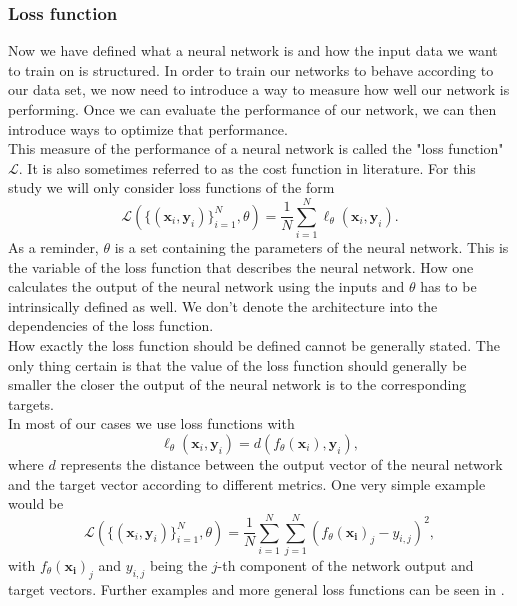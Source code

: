 \subsubsection{Loss function}
Now we have defined what a neural network is and how the input data we want to train on is structured. In order to train our networks to behave according to our data set, we now need to introduce a way to measure how well our network is performing. Once we can evaluate the performance of our network, we can then introduce ways to optimize that performance.\\
This measure of the performance of a neural network is called the "loss function" $\mathscr{L}$. It is also sometimes referred to as the cost function in literature. For this study we will only consider loss functions of the form 
\begin{equation}\label{eq:Loss_longform}
	\mathscr{L}\left( \{(\mathbf{x}_i, \mathbf{y}_i)\}_{i=1}^{N}, \theta \right) = \frac{1}{N} \sum_{i=1}^{N} \ell_\theta\left(\mathbf{x}_i,\mathbf{y}_i\right).
\end{equation}
As a reminder, $\theta$ is a set containing the parameters of the neural network. This is the variable of the loss function that describes the neural network. How one calculates the output of the neural network using the inputs and $\theta$ has to be intrinsically defined as well. We don't denote the architecture into the dependencies of the loss function. \\
How exactly the loss function should be defined cannot be generally stated. The only thing certain is that the value of the loss function should generally be smaller the closer the output of the neural network is to the corresponding targets.\\
In most of our cases we use loss functions with 
\begin{equation}
	\ell_\theta \left( \mathbf{x}_i,\mathbf{y}_i\right) = 
	d\left(f_\theta(\mathbf{x}_i), \mathbf{y}_i\right),
\end{equation}
where $d$ represents the distance between the output vector of the neural network and the target vector according to different metrics. One very simple example would be 
\begin{equation}
	\mathscr{L}\left( \{(\mathbf{x}_i, \mathbf{y}_i)\}_{i=1}^{N}, \theta \right) = \frac{1}{N} \sum_{i=1}^{N} \sum_{j=1}^{N} \left(f_\theta(\mathbf{x_{i}})_j - y_{i,j}\right)^2,
\end{equation}
with $f_\theta(\mathbf{x_{i}})_j$ and $y_{i,j}$ being the $j$-th component of the network output and target vectors. Further examples and more general loss functions can be seen in \cite{LossExamplePaper}.

